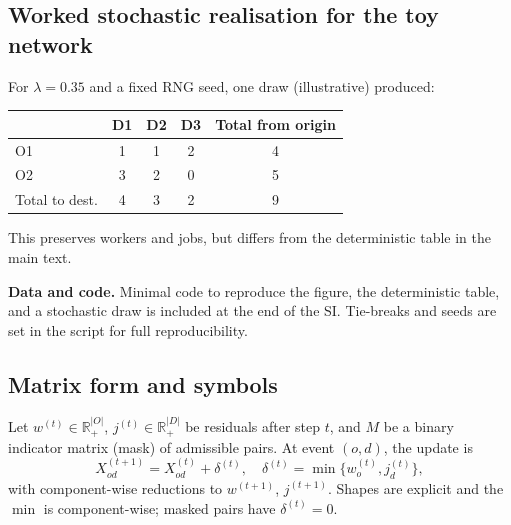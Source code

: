 \subsection{Worked stochastic realisation for the toy network}\label{si:stochastic-example}
For $\lambda=0.35$ and a fixed RNG seed, one draw (illustrative) produced:
\begin{center}
\begin{tabular}{lccc|c}
\toprule
 & D1 & D2 & D3 & Total from origin\\
\midrule
O1 & 1 & 1 & 2 & 4\\
O2 & 3 & 2 & 0 & 5\\
\midrule
Total to dest. & 4 & 3 & 2 & 9\\
\bottomrule
\end{tabular}
\end{center}
This preserves workers and jobs, but differs from the deterministic table in the main text. 

\bigskip
\noindent\textbf{Data and code.} Minimal code to reproduce the figure, the deterministic table, and a stochastic draw is included at the end of the SI. Tie-breaks and seeds are set in the script for full reproducibility.

\subsection{Matrix form and symbols}\label{si:matrix}

Let $w^{(t)}\in\mathbb{R}_+^{|O|}$, $j^{(t)}\in\mathbb{R}_+^{|D|}$ be residuals after step $t$, and $M$ be a binary indicator matrix (mask) of admissible pairs. At event $(o,d)$, the update is
\begin{equation}
X_{od}^{(t+1)}=X_{od}^{(t)}+\delta^{(t)},\quad \delta^{(t)}=\min\{w_o^{(t)},j_d^{(t)}\},
\end{equation}
with component-wise reductions to $w^{(t+1)}$, $j^{(t+1)}$. Shapes are explicit and the $\min$ is component-wise; masked pairs have $\delta^{(t)}=0$.




